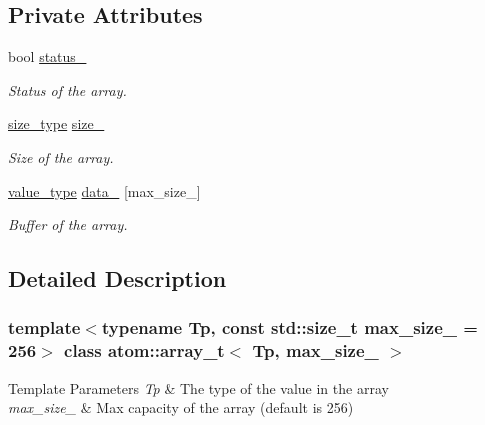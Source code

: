 \subsection*{Private Attributes}
\begin{DoxyCompactItemize}
\item 
\mbox{\label{classatom_1_1array__t_a621a080eeb6d2d7501221fed64f3a1d1}} 
bool \hyperlink{classatom_1_1array__t_a621a080eeb6d2d7501221fed64f3a1d1}{status\+\_\+}
\begin{DoxyCompactList}\small\item\em Status of the array. \end{DoxyCompactList}\item 
\mbox{\label{classatom_1_1array__t_a56208ec116be4941be22dde2f921203e}} 
\hyperlink{classatom_1_1array__t_a8534f23c7f0082698cbd708e1f2e26ff}{size\+\_\+type} \hyperlink{classatom_1_1array__t_a56208ec116be4941be22dde2f921203e}{size\+\_\+}
\begin{DoxyCompactList}\small\item\em Size of the array. \end{DoxyCompactList}\item 
\mbox{\label{classatom_1_1array__t_afb74074f5cc1bb0dc10c6c556ecb12d4}} 
\hyperlink{classatom_1_1array__t_aeb485cd6190dc11ddb8e7f48c09451c4}{value\+\_\+type} \hyperlink{classatom_1_1array__t_afb74074f5cc1bb0dc10c6c556ecb12d4}{data\+\_\+} \mbox{[}max\+\_\+size\+\_\+\mbox{]}
\begin{DoxyCompactList}\small\item\em Buffer of the array. \end{DoxyCompactList}\end{DoxyCompactItemize}


\subsection{Detailed Description}
\subsubsection*{template$<$typename Tp, const std\+::size\+\_\+t max\+\_\+size\+\_\+ = 256$>$\newline
class atom\+::array\+\_\+t$<$ Tp, max\+\_\+size\+\_\+ $>$}


\begin{DoxyTemplParams}{Template Parameters}
{\em Tp} & The type of the value in the array \\
\hline
{\em max\+\_\+size\+\_\+} & Max capacity of the array (default is 256) \\
\hline
\end{DoxyTemplParams}


